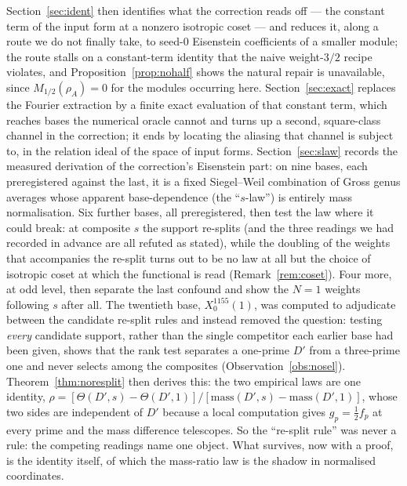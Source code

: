 \documentclass[11pt,reqno]{amsart}
\theoremstyle{plain}
\theoremstyle{definition}
\begin{document}
Section~\ref{sec:ident} then identifies what the correction reads off --- the constant term of
the input form at a nonzero isotropic coset --- and reduces it, along a route we do not finally
take, to seed-$0$ Eisenstein coefficients of a smaller module; the route stalls on a
constant-term identity that the naive weight-$3/2$ recipe violates, and
Proposition~\ref{prop:nohalf} shows the natural repair is unavailable, since
$M_{1/2}(\rho_A)=0$ for the modules occurring here. Section~\ref{sec:exact} replaces the
Fourier extraction by a finite exact evaluation of that constant term, which reaches bases the
numerical oracle cannot and turns up a second, square-class channel in the correction; it ends
by locating the aliasing that channel is subject to, in the relation ideal of the space of input
forms. Section~\ref{sec:slaw} records the measured derivation of the
correction's Eisenstein part: on nine bases, each preregistered against the last, it is a fixed
Siegel--Weil combination of Gross genus averages whose apparent base-dependence (the ``$s$-law'')
is entirely mass normalisation. Six further bases, all preregistered, then test the law where
it could break: at composite $s$ the support re-splits (and the three readings we had recorded
in advance are all refuted as stated), while the doubling of the weights that accompanies the
re-split turns out to be no law at all but the choice of isotropic coset at which the functional
is read (Remark~\ref{rem:coset}). Four more, at odd level, then separate the last confound and
show the $N=1$ weights following $s$ after all. The twentieth base, $X_0^{1155}(1)$, was
computed to adjudicate between the candidate re-split rules and instead removed the question:
testing \emph{every} candidate support, rather than the single competitor each earlier base had
been given, shows that the rank test separates a one-prime $D'$ from a three-prime one and
never selects among the composites (Observation~\ref{obs:nosel}). Theorem~\ref{thm:noresplit}
then derives this: the two empirical laws are one identity,
$\rho=[\Theta(D',s)-\Theta(D',1)]/[\mathrm{mass}(D',s)-\mathrm{mass}(D',1)]$, whose two sides
are independent of $D'$ because a local computation gives $g_p=\tfrac12f_p$ at every prime and
the mass difference telescopes. So the ``re-split rule'' was never a rule: the competing
readings name one object. What survives, now with a proof, is the identity itself, of which the
mass-ratio law is the shadow in normalised coordinates.
\end{document}
